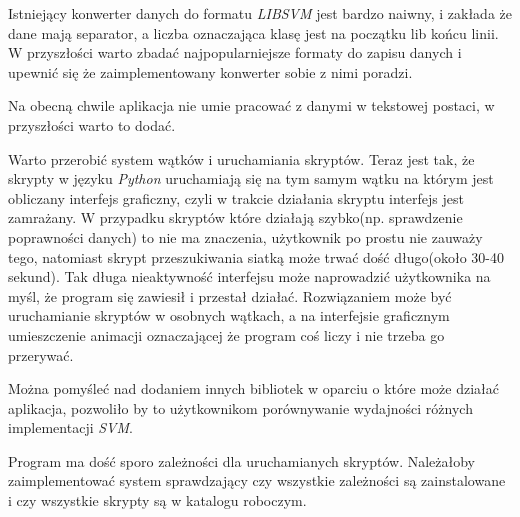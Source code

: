 \documentclass[paper=a4, fontsize=11pt]{scrartcl} %
\numberwithin{equation}{section} %
\numberwithin{figure}{section} %
\begin{document}
    \par Istniejący konwerter danych do formatu \textit{LIBSVM} jest bardzo naiwny, i zakłada
    że dane mają separator, a liczba oznaczająca klasę jest na początku lib końcu linii. W
    przyszłości warto zbadać najpopularniejsze formaty do zapisu danych i upewnić się że
    zaimplementowany konwerter sobie z nimi poradzi.

    \par Na obecną chwile aplikacja nie umie pracować z danymi w tekstowej postaci, w
    przyszłości warto to dodać. 

    \par Warto przerobić system wątków i uruchamiania skryptów. Teraz jest tak, że skrypty w
    języku \textit{Python} uruchamiają się na tym samym wątku na którym jest obliczany
    interfejs graficzny, czyli w trakcie działania skryptu interfejs jest zamrażany. W
    przypadku skryptów które działają szybko(np. sprawdzenie poprawności danych) to nie ma
    znaczenia, użytkownik po prostu nie zauważy tego, natomiast skrypt przeszukiwania siatką
    może trwać dość długo(około 30-40 sekund). Tak długa nieaktywność interfejsu może
    naprowadzić użytkownika na myśl, że program się zawiesił i przestał działać. Rozwiązaniem
    może być uruchamianie skryptów w osobnych wątkach, a na interfejsie graficznym umieszczenie
    animacji oznaczającej że program coś liczy i nie trzeba go przerywać. 
    
    \par Można pomyśleć nad dodaniem innych bibliotek w oparciu o które może działać aplikacja,
    pozwoliło by to użytkownikom porównywanie wydajności różnych implementacji \textit{SVM}.

    \par Program ma dość sporo zależności dla uruchamianych skryptów. Należałoby
    zaimplementować system sprawdzający czy wszystkie zależności są zainstalowane i czy
    wszystkie skrypty są w katalogu roboczym.
     

\newpage
\nocite{*}
\printbibliography
\end{document}
